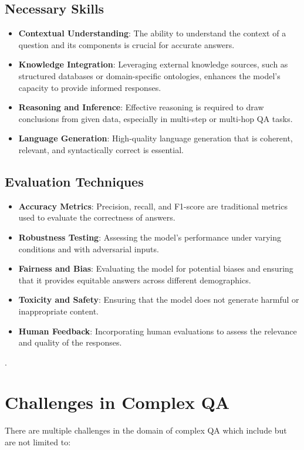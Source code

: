 \documentclass{article}
\begin{document}
\subsection{Necessary Skills}
\begin{itemize}
    \item \textbf{Contextual Understanding}: The ability to understand the context of a question and its components is crucial for accurate answers.
    \item \textbf{Knowledge Integration}: Leveraging external knowledge sources, such as structured databases or domain-specific ontologies, enhances the model’s capacity to provide informed responses.
    \item \textbf{Reasoning and Inference}: Effective reasoning is required to draw conclusions from given data, especially in multi-step or multi-hop QA tasks.
    \item \textbf{Language Generation}: High-quality language generation that is coherent, relevant, and syntactically correct is essential.
\end{itemize}

\subsection{Evaluation Techniques}
\begin{itemize}
    \item \textbf{Accuracy Metrics}: Precision, recall, and F1-score are traditional metrics used to evaluate the correctness of answers.
    \item \textbf{Robustness Testing}: Assessing the model's performance under varying conditions and with adversarial inputs.
    \item \textbf{Fairness and Bias}: Evaluating the model for potential biases and ensuring that it provides equitable answers across different demographics.
    \item \textbf{Toxicity and Safety}: Ensuring that the model does not generate harmful or inappropriate content.
    \item \textbf{Human Feedback}: Incorporating human evaluations to assess the relevance and quality of the responses.
\end{itemize}

\citep{BERT2019, GPT22020, ChatGPT2022}.

\section{Challenges in Complex QA}
There are multiple challenges in the domain of complex QA which include but are not limited to:
\end{document}
